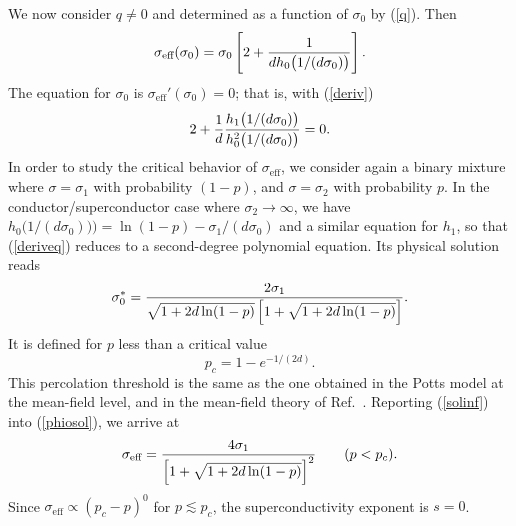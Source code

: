 We now consider $q\neq 0$ and determined as a function of $\sigma_0$
by (\ref{q}). Then
\begin{equation}
\label{phiosol}
\sigma_{\text{eff}}(\sigma_0)=\sigma_0
\left[2+{1\over dh_0
\bigl(1/(d\sigma_0)\bigr)}
\right].
\end{equation}
The equation for $\sigma_0$ is $\sigma_{\text{eff}}'(\sigma_0)=0$; 
that is, with (\ref{deriv})
\begin{equation}
\label{deriveq}
2+{1\over d}{h_1\bigl(1/(d\sigma_0)\bigr)\over
h_0^2\bigl(1/(d\sigma_0)\bigr)}=0.
\end{equation}
In order to study the critical behavior of $\sigma_{\text{eff}}$, 
we consider again a binary mixture where $\sigma=\sigma_1$ with
probability $(1-p)$, and $\sigma=\sigma_2$ with probability
$p$. In the conductor/superconductor case where
$\sigma_2\to\infty$, we have
$h_0\bigl(1/(d\sigma_0))\bigr)=\ln(1-p)-\sigma_1/(d\sigma_0)$ and 
a similar equation for $h_1$, so that (\ref{deriveq}) reduces to 
a second-degree polynomial equation. Its physical solution reads
\begin{equation}
\label{solinf}
\sigma_0^*={2\sigma_1\over\sqrt{1+2d\ln(1-p)}
\left[1+\sqrt{1+2d\ln(1-p)}\right]}.
\end{equation}
It is defined for $p$ less than a critical value
\begin{equation}
p_c=1-e^{-1/(2d)}.
\end{equation}
This percolation threshold is the same as the one obtained in the Potts 
model at the mean-field level, and in the 
mean-field theory
of Ref.\ \cite{STEP77}. Reporting (\ref{solinf}) into (\ref{phiosol}), 
we arrive at
\begin{equation}
\sigma_{\text{eff}}={4\sigma_1\over
\left[1+\sqrt{1+2d\ln(1-p)}\right]^2}\qquad(p<p_c).\\
\end{equation}
Since $\sigma_{\text{eff}}\propto (p_c-p)^0$
for $p\lesssim p_c$, the superconductivity exponent is $s=0$.

